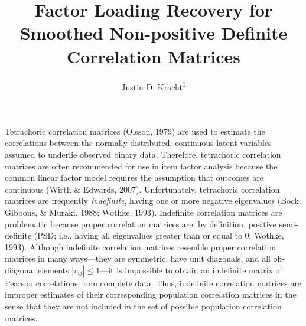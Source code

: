 \documentclass[
  english,
  man]{apa6}
\title{Factor Loading Recovery for Smoothed Non-positive Definite Correlation Matrices}
\author{Justin D. Kracht\textsuperscript{1}}
\date{}
\affiliation{\vspace{0.5cm}\textsuperscript{1} University of Minnesota}
\begin{document}
\maketitle

\newcommand{\Rsm}{\mathbf{R}_{\textrm{Sm}}}
\newcommand{\Rpop}{\mathbf{R}_{\textrm{Pop}}}
\newcommand{\Rnpd}{\mathbf{R}_{-}}
\newcommand{\Rapa}{\mathbf{R}_{\textrm{APA}}}
\newcommand{\Rby}{\mathbf{R}_{\textrm{BY}}}
\newcommand{\Rkb}{\mathbf{R}_{\textrm{KB}}}
\newcommand{\dg}{\textrm{dg}}
\newcommand{\RMSE}{\textrm{RMSE}(\mathbf{\Lambda}, \hat{\mathbf{\Lambda}})}

Tetrachoric correlation matrices (Olsson, 1979) are used to estimate the correlations between the normally-distributed, continuous latent variables assumed to underlie observed binary data. Therefore, tetrachoric correlation matrices are often recommended for use in item factor analysis because the common linear factor model requires the assumption that outcomes are continuous (Wirth \& Edwards, 2007). Unfortunately, tetrachoric correlation matrices are frequently \emph{indefinite}, having one or more negative eigenvalues (Bock, Gibbons, \& Muraki, 1988; Wothke, 1993). Indefinite correlation matrices are problematic because proper correlation matrices are, by definition, positive semi-definite (PSD; i.e., having all eigenvalues greater than or equal to 0; Wothke, 1993). Although indefinite correlation matrices resemble proper correlation matrices in many ways---they are symmetric, have unit diagonals, and all off-diagonal elements \(|r_{ij}| \leq 1\)---it is impossible to obtain an indefinite matrix of Pearson correlations from complete data. Thus, indefinite correlation matrices are improper estimates of their corresponding population correlation matrices in the sense that they are not included in the set of possible population correlation matrices.
\end{document}
